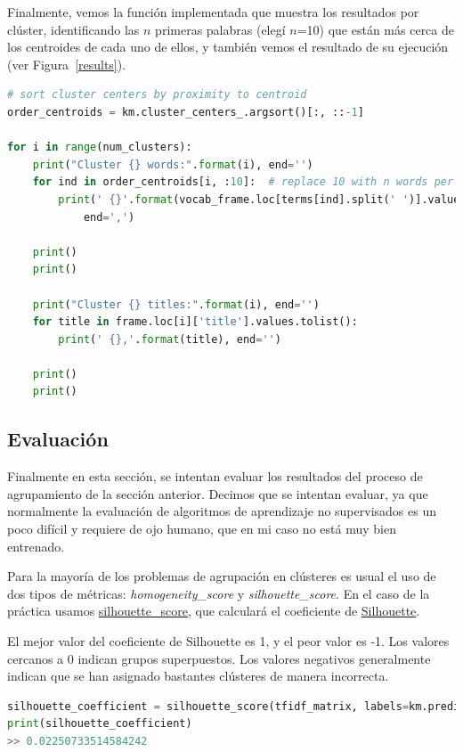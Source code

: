 \documentclass{uimppracticas}
\begin{document}
Finalmente, vemos la función implementada que muestra los resultados por clúster, identificando las $n$ primeras palabras (elegí $n$=10) que están más cerca de los centroides de cada uno de ellos, y también vemos el resultado de su ejecución (ver Figura~\ref{results}). 

\begin{lstlisting}[language=python]
# sort cluster centers by proximity to centroid	
order_centroids = km.cluster_centers_.argsort()[:, ::-1] 

for i in range(num_clusters):
	print("Cluster {} words:".format(i), end='')
	for ind in order_centroids[i, :10]:  # replace 10 with n words per cluster
		print(' {}'.format(vocab_frame.loc[terms[ind].split(' ')].values.tolist()[0][0]), 
			end=',')
	
	print()
	print()
	
	print("Cluster {} titles:".format(i), end='')
	for title in frame.loc[i]['title'].values.tolist():
		print(' {},'.format(title), end='')
	
	print()
	print()
\end{lstlisting}

\subsection{Evaluación}

Finalmente en esta sección, se intentan evaluar los resultados del proceso de agrupamiento de la sección anterior. Decimos que se intentan evaluar, ya que normalmente la evaluación de algoritmos de aprendizaje no supervisados es un poco difícil y requiere de ojo humano, que en mi caso no está muy bien entrenado.
 
Para la mayoría de los problemas de agrupación en clústeres es usual el uso de dos tipos de métricas: \textit{homogeneity\_score} y \textit{silhouette\_score}. En el caso de la práctica usamos \href{https://scikit-learn.org/stable/modules/generated/sklearn.metrics.silhouette_score.html}{silhouette\_score}, que calculará el coeficiente de \href{https://es.wikipedia.org/wiki/Silhouette_(clustering)}{Silhouette}.

El mejor valor del coeficiente de Silhouette es 1, y el peor valor es -1. Los valores cercanos a 0 indican grupos superpuestos. Los valores negativos generalmente indican que se han asignado bastantes clústeres de manera incorrecta.

\begin{lstlisting}[language=python]
silhouette_coefficient = silhouette_score(tfidf_matrix, labels=km.predict(tfidf_matrix))
print(silhouette_coefficient)
>> 0.02250733514584242
\end{lstlisting}
\end{document}

